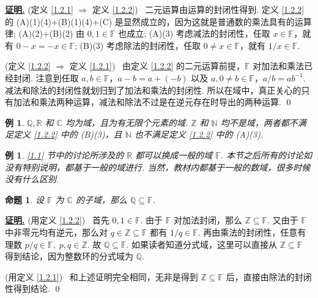 \documentclass[10pt,openany]{article}
\theoremstyle{thmstyle} %
\theoremstyle{defstyle} %
\theoremstyle{prostyle} %
\newtheorem{proposition}[theorem]{命题}
\theoremstyle{exastyle}
\newtheorem{example}[theorem]{例}
\theoremstyle{remstyle}
\renewenvironment{proof}[1][证明]{\par\underline{\textbf{#1.}} \;\fangsong}{\qed\par}
\newcommand{\F}{\mathbb{F}}
\begin{document}
\begin{proof}
	(定义 \ref{1.2.1}  \( \Rightarrow \) 定义 \ref{1.2.2}) \ 二元运算由运算的封闭性得到. 定义 \ref{1.2.2} 的 (A)(1)(4)+(B)(1)(4)+(C) 是显然成立的，因为这就是普通数的乘法具有的运算律; (A)(2)+(B)(2) 由 \( 0,1 \in \F \) 也成立; (A)(3) 考虑减法的封闭性，任取 \( x \in \F \)，就有 \( 0-x=-x \in \F \); (B)(3) 考虑除法的封闭性，任取 \( 0 \neq x \in \F \)，就有 \( 1/x \in \F \).
	
	\vspace{1ex}
	
	(定义 \ref{1.2.2}  \( \Rightarrow \) 定义 \ref{1.2.1}) \ 由定义 \ref{1.2.2} 的二元运算前提，\( \F \) 对加法和乘法已经封闭. 注意到任取 \( a,b \in \F \)，\( a-b=a+(-b) \) 以及 \( a, 0 \neq b \in \F \)，\( a/b=ab^{-1} \). 减法和除法的封闭性就划归到了加法和乘法的封闭性. 所以在域中，真正关心的只有加法和乘法两种运算，减法和除法不过是在逆元存在时导出的两种运算.
\end{proof}

\begin{example}
	\( \mathbb{Q}, \mathbb{R} \) 和 \( \mathbb{C} \) 均为域，且为有无限个元素的域. \( \mathbb{Z} \) 和 \( \mathbb{N} \) 均不是域，两者都不满足定义 \ref{1.2.2} 中的 (B)(3)，且 \( \mathbb{N} \) 也不满足定义 \ref{1.2.2} 中的 (A)(3).
\end{example}

\begin{example}
	\ref{1.1} 节中的讨论所涉及的 \( \mathbb{R} \) 都可以换成一般的域 \( \F \). 本节之后所有的讨论如没有特别说明，都基于一般的域进行. 当然，教材内都基于一般的数域，很多时候没有什么区别.
\end{example}

\begin{proposition}
	设 \( \F \) 为 \( \mathbb{C} \) 的子域，那么 \( \mathbb{Q} \subseteq \F \).
	\label{1.2.6}
\end{proposition}

\begin{proof}
	(用定义 \ref{1.2.2}) \ 首先 \( 0,1 \in \F \). 由于 \( \F \) 对加法封闭，那么 \( \mathbb{Z} \subseteq \F \). 又由于 \( \F \) 中非零元均有逆元，那么对 \( q \in \mathbb{Z} \subseteq \F \) 都有 \( 1/q \in \F \). 再由乘法的封闭性，任意有理数 \( p/q \in \F, \; p,q \in \mathbb{Z} \). 故 \( \mathbb{Q} \subseteq \F \). 如果读者知道分式域，这里可以直接从 \( \mathbb{Z} \subseteq \F \) 得到结论，因为整数环的分式域为 \( \mathbb{Q} \).
	
	\vspace{1ex}
	
	(用定义 \ref{1.2.1}) \ 和上述证明完全相同，无非是得到 \( \mathbb{Z} \subseteq \F \) 后，直接由除法的封闭性得到结论.
\end{proof}
\end{document}
